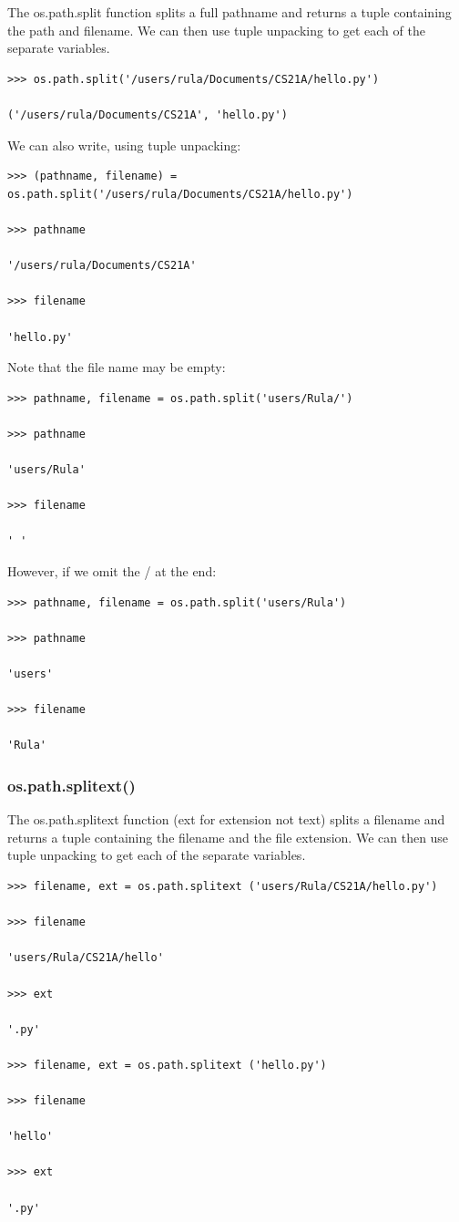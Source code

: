 \documentclass{article}
\begin{document}
The os.path.split function splits a full pathname and returns a tuple containing the path and filename. We can then use tuple unpacking to get each of the separate variables.

\begin{lstlisting}
>>> os.path.split('/users/rula/Documents/CS21A/hello.py')

('/users/rula/Documents/CS21A', 'hello.py')
\end{lstlisting}

We can also write, using tuple unpacking:

\begin{lstlisting}
>>> (pathname, filename) = os.path.split('/users/rula/Documents/CS21A/hello.py')

>>> pathname

'/users/rula/Documents/CS21A'

>>> filename

'hello.py'
\end{lstlisting}

Note that the file name may be empty:

\begin{lstlisting}
>>> pathname, filename = os.path.split('users/Rula/')

>>> pathname

'users/Rula'

>>> filename

' '
\end{lstlisting}

However, if we omit the / at the end:

\begin{lstlisting}
>>> pathname, filename = os.path.split('users/Rula')

>>> pathname

'users'

>>> filename

'Rula'
\end{lstlisting}

\subsubsection{os.path.splitext()}


The os.path.splitext function (ext for extension not text) splits a filename and returns a tuple containing the filename and the file extension. We can then use tuple unpacking to get each of the separate variables.
\begin{lstlisting}
>>> filename, ext = os.path.splitext ('users/Rula/CS21A/hello.py')

>>> filename

'users/Rula/CS21A/hello'

>>> ext

'.py'

>>> filename, ext = os.path.splitext ('hello.py')

>>> filename

'hello'

>>> ext

'.py'
\end{lstlisting}
\end{document}
